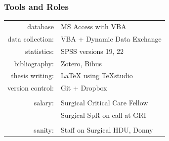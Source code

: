 \documentclass[10pt]{beamer}
\begin{document}
\begin{frame}
\frametitle{Tools and Roles}

\begin{table}
	\begin{tabular}{r l}
		        database & MS Access with VBA            \\
		data collection: & VBA + Dynamic Data Exchange   \\
		     statistics: & SPSS versions 19, 22          \\
		   bibliography: & Zotero, Bibus                 \\
		 thesis writing: & LaTeX using TeXstudio         \\
		version control: & Git + Dropbox                 \\
		                 &  \\
		         salary: & Surgical Critical Care Fellow \\
		                 & Surgical SpR on-call at GRI   \\
		                 & \\
		         sanity: & Staff on Surgical HDU, Donny
	\end{tabular}
\end{table}




\end{frame}

\end{document}
